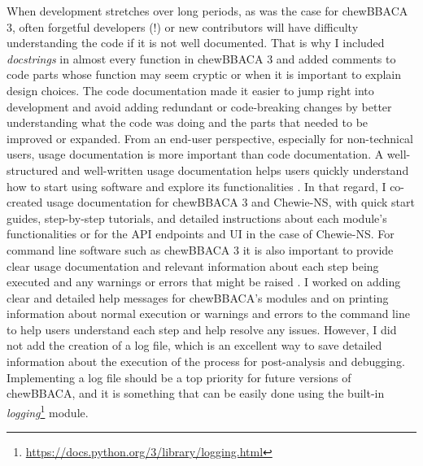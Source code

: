 When development stretches over long periods, as was the case for chewBBACA 3, often forgetful developers (!) or new contributors will have difficulty understanding the code if it is not well documented. That is why I included \textit{docstrings} in almost every function in chewBBACA 3 and added comments to code parts whose function may seem cryptic or when it is important to explain design choices. The code documentation made it easier to jump right into development and avoid adding redundant or code-breaking changes by better understanding what the code was doing and the parts that needed to be improved or expanded. From an end-user perspective, especially for non-technical users, usage documentation is more important than code documentation. A well-structured and well-written usage documentation helps users quickly understand how to start using software and explore its functionalities \cite{karimzadeh_top_2018}. In that regard, I co-created usage documentation for chewBBACA 3 and \ac{Chewie-NS}, with quick start guides, step-by-step tutorials, and detailed instructions about each module's functionalities or for the \ac{API} endpoints and \ac{UI} in the case of \ac{Chewie-NS}. For command line software such as chewBBACA 3 it is also important to provide clear usage documentation and relevant information about each step being executed and any warnings or errors that might be raised \cite{seemann_ten_2013}. I worked on adding clear and detailed help messages for chewBBACA's modules and on printing information about normal execution or warnings and errors to the command line to help users understand each step and help resolve any issues. However, I did not add the creation of a log file, which is an excellent way to save detailed information about the execution of the process for post-analysis and debugging. Implementing a log file should be a top priority for future versions of chewBBACA, and it is something that can be easily done using the built-in \textit{logging}\footnote{\url{https://docs.python.org/3/library/logging.html}} module.

